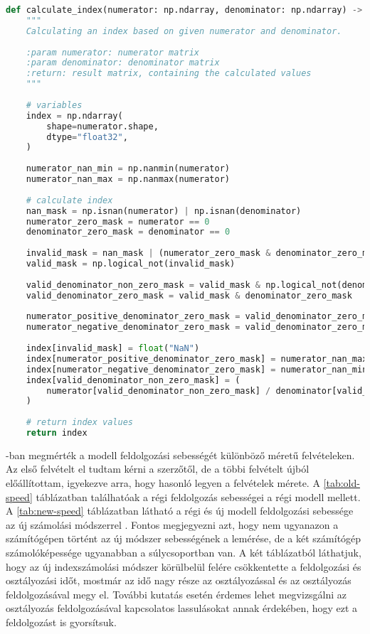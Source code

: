 \begin{lstlisting}[language={Python}]
def calculate_index(numerator: np.ndarray, denominator: np.ndarray) -> np.ndarray:
    """
    Calculating an index based on given numerator and denominator.
    
    :param numerator: numerator matrix
    :param denominator: denominator matrix
    :return: result matrix, containing the calculated values
    """
    
    # variables
    index = np.ndarray(
        shape=numerator.shape,
        dtype="float32",
    )
    
    numerator_nan_min = np.nanmin(numerator)
    numerator_nan_max = np.nanmax(numerator)
    
    # calculate index
    nan_mask = np.isnan(numerator) | np.isnan(denominator)
    numerator_zero_mask = numerator == 0
    denominator_zero_mask = denominator == 0
    
    invalid_mask = nan_mask | (numerator_zero_mask & denominator_zero_mask)
    valid_mask = np.logical_not(invalid_mask)
    
    valid_denominator_non_zero_mask = valid_mask & np.logical_not(denominator_zero_mask)
    valid_denominator_zero_mask = valid_mask & denominator_zero_mask
    
    numerator_positive_denominator_zero_mask = valid_denominator_zero_mask & (numerator > 0)
    numerator_negative_denominator_zero_mask = valid_denominator_zero_mask & (numerator < 0)
    
    index[invalid_mask] = float("NaN")
    index[numerator_positive_denominator_zero_mask] = numerator_nan_max
    index[numerator_negative_denominator_zero_mask] = numerator_nan_min
    index[valid_denominator_non_zero_mask] = (
        numerator[valid_denominator_non_zero_mask] / denominator[valid_denominator_non_zero_mask]
    )
    
    # return index values
    return index
\end{lstlisting}

\cite{magyar2023}-ban megmérték a modell feldolgozási sebességét különböző méretű felvételeken. Az első felvételt el tudtam kérni a szerzőtől, de a többi felvételt újból előállítottam, igyekezve arra, hogy hasonló legyen a felvételek mérete. A \ref{tab:old-speed} táblázatban találhatóak a régi feldolgozás sebességei a régi modell mellett. A \ref{tab:new-speed} táblázatban látható a régi és új modell feldolgozási sebessége az új számolási módszerrel . Fontos megjegyezni azt, hogy nem ugyanazon a számítógépen történt az új módszer sebességének a lemérése, de a két számítógép számolóképessége ugyanabban a súlycsoportban van. A két táblázatból láthatjuk, hogy az új indexszámolási módszer körülbelül felére csökkentette a feldolgozási és osztályozási időt, mostmár az idő nagy része az osztályozással és az osztályozás feldolgozásával megy el. További kutatás esetén érdemes lehet megvizsgálni az osztályozás feldolgozásával kapcsolatos lassulásokat annak érdekében, hogy ezt a feldolgozást is gyorsítsuk.

